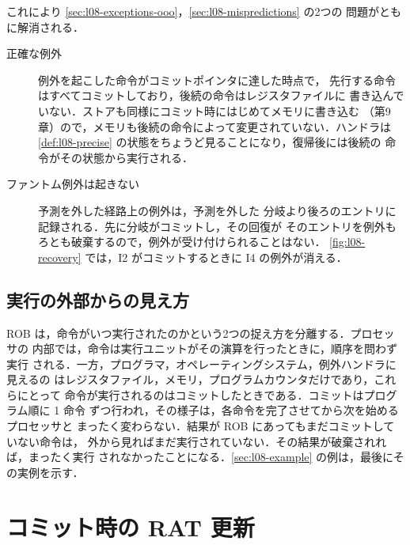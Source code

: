 \documentclass[../main.tex]{subfiles}
\begin{document}
これにより \cref{sec:l08-exceptions-ooo}，\cref{sec:l08-mispredictions} の2つの
問題がともに解消される．
\begin{description}
  \item[正確な例外] 例外を起こした命令がコミットポインタに達した時点で，
    先行する命令はすべてコミットしており，後続の命令はレジスタファイルに
    書き込んでいない．ストアも同様にコミット時にはじめてメモリに書き込む
    （第9章）ので，メモリも後続の命令によって変更されていない．ハンドラは
    \cref{def:l08-precise} の状態をちょうど見ることになり，復帰後には後続の
    命令がその状態から実行される．
  \item[ファントム例外は起きない] 予測を外した経路上の例外は，予測を外した
    分岐より後ろのエントリに記録される．先に分岐がコミットし，その回復が
    そのエントリを例外もろとも破棄するので，例外が受け付けられることはない．
    \cref{fig:l08-recovery} では，I2 がコミットするときに I4 の例外が消える．
\end{description}

\subsection{実行の外部からの見え方}
\label{sec:l08-outside}

ROB は，命令がいつ実行されたのかという2つの捉え方を分離する．プロセッサの
内部では，命令は実行ユニットがその演算を行ったときに，順序を問わず実行
される．一方，プログラマ，オペレーティングシステム，例外ハンドラに見えるの
はレジスタファイル，メモリ，プログラムカウンタだけであり，これらにとって
命令が実行されるのはコミットしたときである．コミットはプログラム順に 1 命令
ずつ行われ，その様子は，各命令を完了させてから次を始めるプロセッサと
まったく変わらない．結果が ROB にあってもまだコミットしていない命令は，
外から見ればまだ実行されていない．その結果が破棄されれば，まったく実行
されなかったことになる．\cref{sec:l08-example} の例は，最後にその実例を示す．

\section{コミット時の RAT 更新}
\label{sec:l08-rat}
\end{document}
